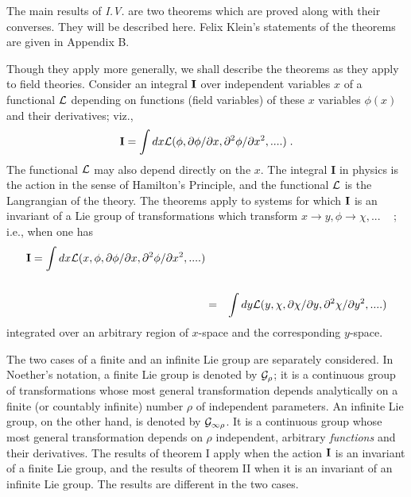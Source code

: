\documentclass[12pt]{article}
\begin{document}
The main results of {\it{I.V.}} are two theorems which are proved along
with their converses.
  They
will be described here. Felix Klein's statements \cite{basil} of the theorems
 are given  in Appendix B. 

Though they apply more generally, we shall describe the
theorems as they apply to field theories. Consider an integral
${\bf{I}}$
over independent variables $x$ of a functional $\cal{L}$ depending on
functions (field variables) of these $x$ variables $\phi(x)$ and  their derivatives; viz.,
\begin{equation}
{\bf{I}} = \int dx {\cal{L}}( \phi, \partial \phi/ \partial x, \partial^2 \phi/
\partial x ^2, ....) \; .                                                          
\end{equation}
 The
functional $\cal{L}$ may also depend directly on the $x$.
 The integral
 {\bf{I}} in physics 
is the action in the sense of Hamilton's Principle, 
and the functional  $\cal{L}$ is the Langrangian  of the theory.
The theorems apply to systems for which ${\bf{I}}$ is an invariant 
of a Lie group of transformations which transform $x \rightarrow y,
\phi \rightarrow \chi, ... $ ~ ; i.e., when one has
\begin{eqnarray}
{\bf{I}} =  \int dx {\cal{L}}(x, \phi, \partial \phi/ \partial x, \partial^2 \phi/
\partial x ^2, ....)   \nonumber                  \\
& & \\
& = & \int dy {\cal{L}}(y, \chi, \partial \chi/ \partial y, \partial^2 \chi/
\partial y^2, ....) \nonumber
\end{eqnarray}
integrated over an arbitrary region of $x$-space and the corresponding
$y$-space.

The two cases of a finite and an infinite Lie group are separately considered.
In Noether's notation,   a finite Lie group is denoted by $\cal{G}_\rho$; it is a continuous group  of transformations
whose most general transformation depends analytically on a 
finite (or countably infinite) number $\rho$ of independent 
parameters. An infinite Lie group, on the other hand, is denoted by 
$\cal{G}_{\infty\rho}$. It 
is a continuous group 
whose most general transformation depends on $\rho$ independent, arbitrary
 {\it{functions}} and their derivatives.  The results of theorem I  apply when the action ${\bf{I}}$
is an invariant 
 of a finite Lie group, and the results of theorem II when it is an invariant of
an infinite Lie group. The results are different in the two cases.
                                                    
\end{document}
